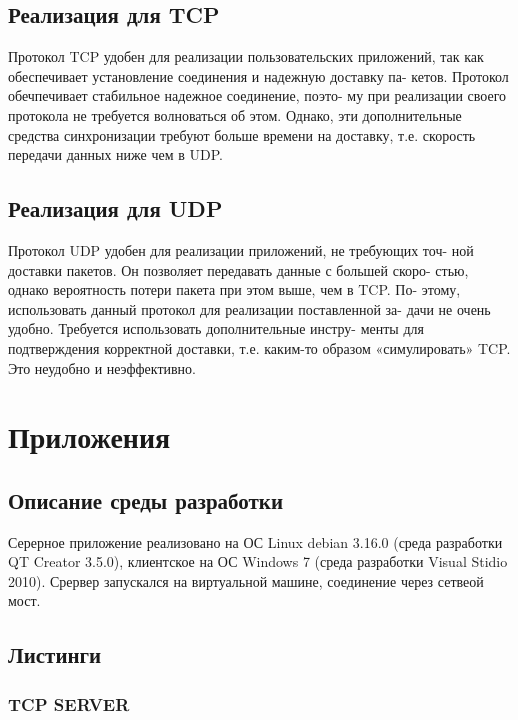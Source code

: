 \documentclass[12pt,a4paper]{report}
\begin{document}
\section{Реализация для TCP}
Протокол TCP удобен для реализации пользовательских приложений,
так как обеспечивает установление соединения и надежную доставку па-
кетов. Протокол обечпечивает стабильное надежное соединение, поэто-
му при реализации своего протокола не требуется волноваться об этом.
Однако, эти дополнительные средства синхронизации требуют больше
времени на доставку, т.е. скорость передачи данных ниже чем в UDP.

\section{Реализация для UDP}
Протокол UDP удобен для реализации приложений, не требующих точ-
ной доставки пакетов. Он позволяет передавать данные с большей скоро-
стью, однако вероятность потери пакета при этом выше, чем в TCP. По-
этому, использовать данный протокол для реализации поставленной за-
дачи не очень удобно. Требуется использовать дополнительные инстру-
менты для подтверждения корректной доставки, т.е. каким-то образом
«симулировать» TCP. Это неудобно и неэффективно.
\chapter*{Приложения}
\section*{Описание среды разработки}
Серерное приложение реализовано на ОС Linux debian 3.16.0 (среда разработки QT Creator 3.5.0), клиентское на ОС Windows 7 (среда разработки Visual Stidio 2010). Срервер запускался на виртуальной машине, соединение через сетвеой мост.

\section*{Листинги}
\subsection*{TCP SERVER}
\end{document}
